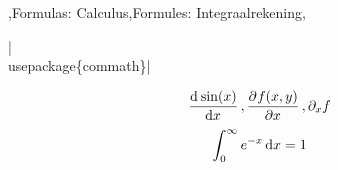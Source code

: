 \documentclass[presentatie.tex]{subfiles}
\begin{document}

\begin{frame}
	{\lang,Formulas: Calculus,Formules: Integraalrekening,}

	\hll|\\usepackage\{commath\}|


	\begin{align*}
		\dod{\sin(x)}{x}, \dpd{f(x,y)}{x}, \partial_x f
	\end{align*}
	\begin{align*}
		\int_{0}^{\infty}e^{-x}\dif x = 1
	\end{align*}
\end{frame}



	

	

	
	
\end{document}
